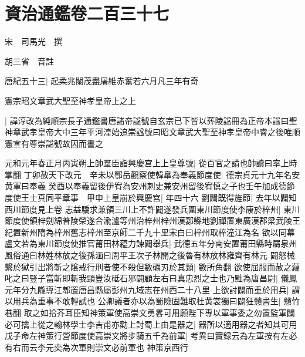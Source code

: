 \chapter{資治通鑑卷二百三十七}
宋　司馬光　撰

胡三省　音註

唐紀五十三|{
	起柔兆閹茂盡屠維赤奮若六月凡三年有奇}


憲宗昭文章武大聖至神孝皇帝上之上

|{
	諱淳改為純順宗長子通鑑書唐諸帝諡號自玄宗已下皆以葬陵諡冊為正帝本諡曰聖神章武孝皇帝大中三年平河湟始追崇諡號曰昭文章武大聖至神孝皇帝中睿之後唯順憲宣有尊崇諡號故因而書之}


元和元年春正月丙寅朔上帥羣臣詣興慶宫上上皇尊號|{
	從百官之請也帥讀曰率上時掌翻}
丁卯赦天下改元　辛未以鄂岳觀察使韓臯為奉義節度使|{
	德宗貞元十九年名安黄軍曰奉義}
癸酉以奉義留後伊宥為安州刺史兼安州留後宥慎之子也壬午加成德節度使王士真同平章事　甲申上皇崩於興慶宫|{
	年四十六}
劉闢既得旌節|{
	去年以闢知西川節度見上卷}
志益驕求兼領三川上不許闢遂發兵圍東川節度使李康於梓州|{
	東川節度使領梓劍綿普陵榮遂合渝瀘等州治梓州梓州漢郪縣地劉禪置東廣漢郡梁武陵王紀置新州隋為梓州舊志梓州至京師二千九十里宋白曰梓州取梓潼江為名}
欲以同幕盧文若為東川節度使推官莆田林藴力諫闢舉兵|{
	武德五年分南安置莆田縣時屬泉州風俗通曰林姓林放之後孫湎曰周平王次子林開之後魯有林放林雍齊有林元}
闢怒械繫於獄引出將斬之隂戒行刑者使不殺但數礪刃於其頸|{
	數所角翻}
欲使屈服而赦之藴叱之曰豎子當斬即斬我頸豈汝砥石邪闢顧左右曰真忠烈之士也乃黜為唐昌尉|{
	儀鳳元年分九隴導江郫置唐昌縣屬彭州九域志在州西二十八里}
上欲討闢而重於用兵|{
	謂以用兵為重事不敢輕試也}
公卿議者亦以為蜀險固難取杜黄裳獨曰闢狂戇書生|{
	戇竹巷翻}
取之如拾芥耳臣知神策軍使高崇文勇畧可用願陛下專以軍事委之勿置監軍闢必可擒上從之翰林學士李吉甫亦勸上討蜀上由是器之|{
	器所以適用器之者知其可用}
戊子命左神策行營節度使高崇文將步騎五千為前軍|{
	考異曰實録云為左軍按有左必有右而云李元奕為次軍則崇文必前軍也}
神策京西行

